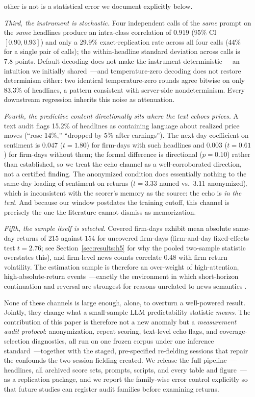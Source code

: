 other is not is a statistical error we document explicitly below.

\emph{Third, the instrument is stochastic.} Four independent calls of the \emph{same} prompt on the \emph{same} headlines produce an intra-class correlation of $0.919$ (95\% CI $[0.90, 0.93]$) and only a 29.9\% exact-replication rate across all four calls (44\% for a single pair of calls); the within-headline standard deviation across calls is 7.8 points. Default decoding does not make the instrument deterministic~---an intuition we initially shared~---and temperature-zero decoding does not restore determinism either: two identical temperature-zero rounds agree bitwise on only 83.3\% of headlines, a pattern consistent with server-side nondeterminism. Every downstream regression inherits this noise as attenuation.

\emph{Fourth, the predictive content directionally sits where the text echoes prices.} A text audit flags 15.2\% of headlines as containing language about realized price moves (``rose 14\%,'' ``dropped by 5\% after earnings''). The next-day coefficient on sentiment is $0.047$ ($t=1.80$) for firm-days with such headlines and $0.003$ ($t=0.61$) for firm-days without them; the formal difference is directional ($p=0.10$) rather than established, so we treat the echo channel as a well-corroborated direction, not a certified finding. The anonymized condition does essentially nothing to the same-day loading of sentiment on returns ($t=3.33$ named vs.\ $3.11$ anonymized), which is inconsistent with the scorer's memory as the source: the echo is \emph{in the text}. And because our window postdates the training cutoff, this channel is precisely the one the literature cannot dismiss as memorization.

\emph{Fifth, the sample itself is selected.} Covered firm-days exhibit mean absolute same-day returns of 215 \bps{} against 154 \bps{} for uncovered firm-days (firm-and-day fixed-effects test $t=2.76$; see Section~\ref{sec:results:h5} for why the pooled two-sample statistic overstates this), and firm-level news counts correlate 0.48 with firm return volatility. The estimation sample is therefore an over-weight of high-attention, high-absolute-return events~---exactly the environment in which short-horizon continuation and reversal are strongest for reasons unrelated to news semantics \citep{chan2003}.

None of these channels is large enough, alone, to overturn a well-powered result. Jointly, they change what a small-sample LLM predictability statistic \emph{means}. The contribution of this paper is therefore not a new anomaly but a \emph{measurement audit protocol}: anonymization, repeat scoring, text-level echo flags, and coverage-selection diagnostics, all run on one frozen corpus under one inference standard~---together with the staged, pre-specified re-fielding sessions that repair the confounds the two-session fielding created. We release the full pipeline~---headlines, all archived score sets, prompts, scripts, and every table and figure~---as a replication package, and we report the family-wise error control explicitly so that future studies can register audit families before examining returns.

